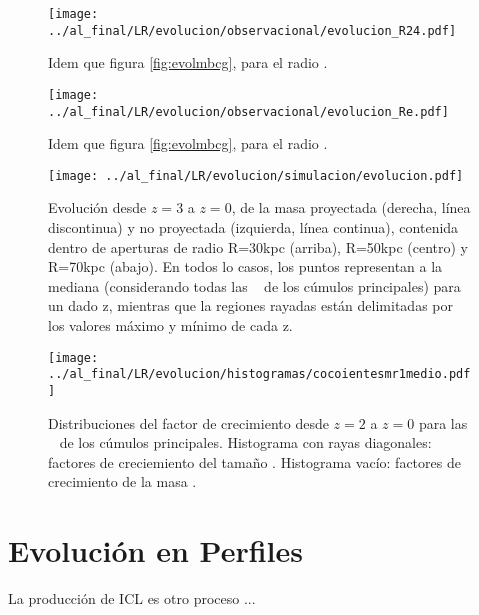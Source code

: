 \begin{figure}[H]
 \centering
 \texttt{[image: ../al\_final/LR/evolucion/observacional/evolucion\_R24.pdf]}
\caption{Idem que figura \ref{fig:evolmbcg}, para el radio \rvc.}
\label{fig:evolr24}
\end{figure}

\begin{figure}[H]
 \centering
 \texttt{[image: ../al\_final/LR/evolucion/observacional/evolucion\_Re.pdf]}
\caption{Idem que figura \ref{fig:evolmbcg}, para el radio \rum.}
\label{fig:evolrum}
\end{figure}


\begin{figure}[H]
 \centering
 \texttt{[image: ../al\_final/LR/evolucion/simulacion/evolucion.pdf]}
\caption{Evoluci\'on desde $z=3$ a $z=0$, de la masa proyectada (derecha, l\'inea discontinua) y no proyectada (izquierda, l\'inea continua), contenida dentro de aperturas de radio R=30kpc
(arriba), R=50kpc (centro) y R=70kpc (abajo). En todos lo casos, los puntos representan a la mediana (considerando todas las \bcgs~ de los c\'umulos principales) para un dado z,
mientras que la regiones rayadas est\'an delimitadas por los valores m\'aximo y m\'inimo de cada z.}
\label{fig:evosim}
\end{figure}




\begin{figure}[H]
 \centering
 \texttt{[image: ../al\_final/LR/evolucion/histogramas/cocoientesmr1medio.pdf]}
\caption{Distribuciones del factor de crecimiento desde $z=2$ a $z=0$ para las \bcgs~ de los c\'umulos principales. Histograma con rayas diagonales: factores de creciemiento del tama\~no \rum.
Histograma vac\'io: factores de crecimiento de la masa \mvc.}
\label{fig:factores}
\end{figure}


\section{Evoluci\'on en Perfiles}
La producci\'on de ICL es otro proceso ...

